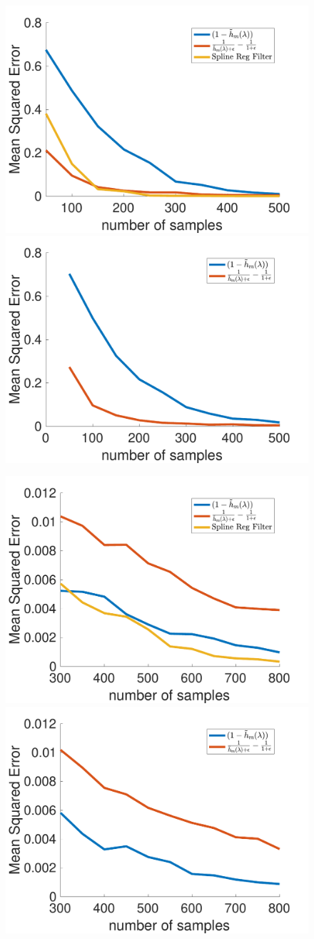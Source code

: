 \documentclass[a4paper]{article}
\theoremstyle{definition}
\begin{document}
\begin{figure}[h!]
\centering
\includegraphics[width = 5 cm]{fig_samlpes_error_trade_off_low_pass}
\includegraphics[width = 5 cm]{fig_samples_error_trade_off_low_pass_2}

\includegraphics[width = 5 cm]{fig_samples_error_trade_off_band_pass}
\includegraphics[width = 5 cm]{fig_samples_error_trade_off_band_pass2}
\end{figure}

\section{}
\end{document}
